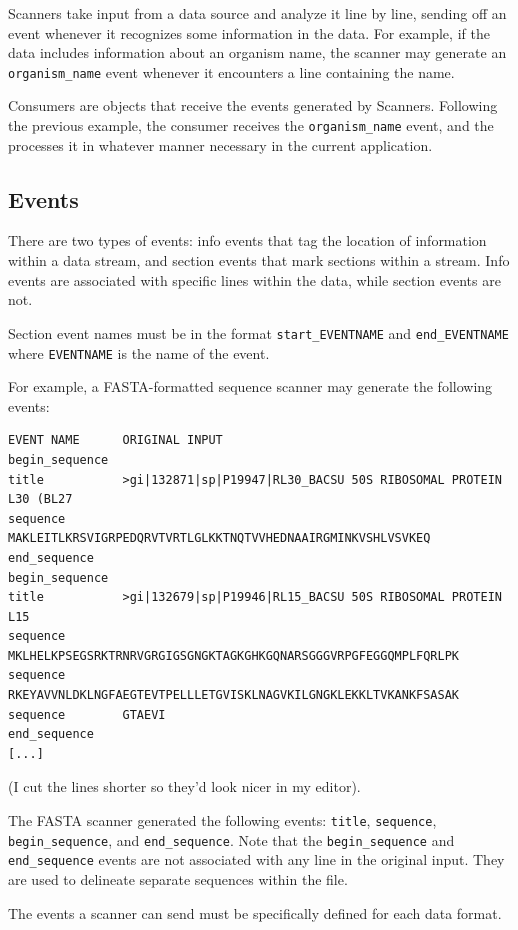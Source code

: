 \documentclass{report}
\begin{document}
Scanners take input from a data source and analyze it line by line,
sending off an event whenever it recognizes some information in the
data.  For example, if the data includes information about an organism
name, the scanner may generate an \verb|organism_name| event whenever it
encounters a line containing the name.


Consumers are objects that receive the events generated by Scanners.
Following the previous example, the consumer receives the
\verb|organism_name| event, and the processes it in whatever manner
necessary in the current application.

\subsection{Events}

There are two types of events: info events that tag the location of
information within a data stream, and section events that mark
sections within a stream.  Info events are associated with specific
lines within the data, while section events are not.


Section event names must be in the format \verb|start_EVENTNAME| and
\verb|end_EVENTNAME| where \verb|EVENTNAME| is the name of the event.


For example, a FASTA-formatted sequence scanner may generate the
following events:
\begin{verbatim}
EVENT NAME      ORIGINAL INPUT
begin_sequence  
title           >gi|132871|sp|P19947|RL30_BACSU 50S RIBOSOMAL PROTEIN L30 (BL27
sequence        MAKLEITLKRSVIGRPEDQRVTVRTLGLKKTNQTVVHEDNAAIRGMINKVSHLVSVKEQ
end_sequence
begin_sequence
title           >gi|132679|sp|P19946|RL15_BACSU 50S RIBOSOMAL PROTEIN L15
sequence        MKLHELKPSEGSRKTRNRVGRGIGSGNGKTAGKGHKGQNARSGGGVRPGFEGGQMPLFQRLPK
sequence        RKEYAVVNLDKLNGFAEGTEVTPELLLETGVISKLNAGVKILGNGKLEKKLTVKANKFSASAK
sequence        GTAEVI
end_sequence
[...]
\end{verbatim}

(I cut the lines shorter so they'd look nicer in my editor).


The FASTA scanner generated the following events: \verb|title|, \verb|sequence|,
\verb|begin_sequence|, and \verb|end_sequence|.  Note that the \verb|begin_sequence|
and \verb|end_sequence| events are not associated with any line in the
original input.  They are used to delineate separate sequences within
the file.


The events a scanner can send must be specifically defined for each
data format.
\end{document}
